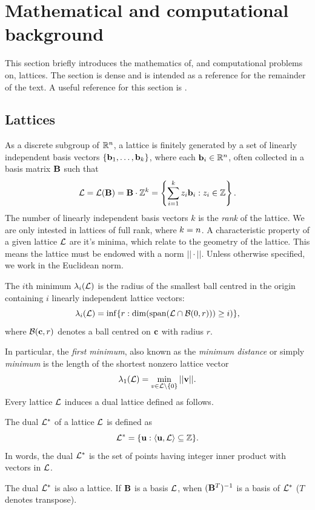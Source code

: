 \section{Mathematical and computational background}\label{sec:background}
This section briefly introduces the mathematics of, and computational problems on, lattices. The section is dense and is intended as a reference for the remainder of the text. A useful reference for this section is \cite{mg02}.

\subsection{Lattices}
As a discrete subgroup of $\mathbb{R}^{n}$, a lattice is finitely generated by a set of linearly independent basis vectors $\{ \mathbf{b}_1, \ldots, \mathbf{b}_k \}$, where each $\mathbf{b}_i \in \mathbb{R}^{n}$, often collected in a basis matrix $\mathbf{B}$ such that
\[ \mathcal{L} = \mathcal{L}(\mathbf{B}) = \mathbf{B} \cdot \mathbb{Z}^k = \left\{ \sum_{i = 1}^{k} z_i \mathbf{b}_i : z_i \in \mathbb{Z}\right\}. \]
The number of linearly independent basis vectors $k$ is the \textit{rank} of the lattice. We are only intested in lattices of full rank, where $k = n$. A characteristic property of a given lattice $\mathcal{L}$ are it's minima, which relate to the geometry of the lattice. This means the lattice must be endowed with a norm $|| \cdot ||$. Unless otherwise specified, we work in the Euclidean norm.

\begin{definition}
    The $i$th minimum $\lambda_i(\mathcal{L})$ is the radius of the smallest ball centred in the origin containing $i$ linearly independent lattice vectors:
    \[ \lambda_i(\mathcal{L}) = \inf\{ r : \dim (\mathrm{span} (\mathcal{L} \cap \mathcal{B}(0,r))) \geq i)\}, \] where $\mathcal{B}(\mathbf{c},r)$ denotes a ball centred on $\mathbf{c}$ with radius $r$.
\end{definition}

In particular, the \textit{first minimum}, also known as the \textit{minimum distance} or simply \textit{minimum} is the length of the shortest nonzero lattice vector 
    \[ \lambda_1(\mathcal{L}) = \min_{v \in \mathcal{L} \setminus \{ 0 \} } || \mathbf{v} ||. \]
Every lattice $\mathcal{L}$ induces a dual lattice defined as follows.
\begin{definition}
    The dual $\mathcal{L}^*$ of a lattice $\mathcal{L}$ is defined as
    \[ \mathcal{L}^* = \{ \mathbf{u} : \langle \mathbf{u}, \mathcal{L} \rangle \subseteq \mathbb{Z} \}. \]
    In words, the dual $\mathcal{L}^*$ is the set of points having integer inner product with vectors in $\mathcal{L}$. 
\end{definition}
The dual $\mathcal{L}^*$ is also a lattice. If $\mathbf{B}$ is a basis $\mathcal{L}$, when $(\mathbf{B}^T)^{-1}$ is a basis of $\mathcal{L}^*$ ($T$ denotes transpose).

